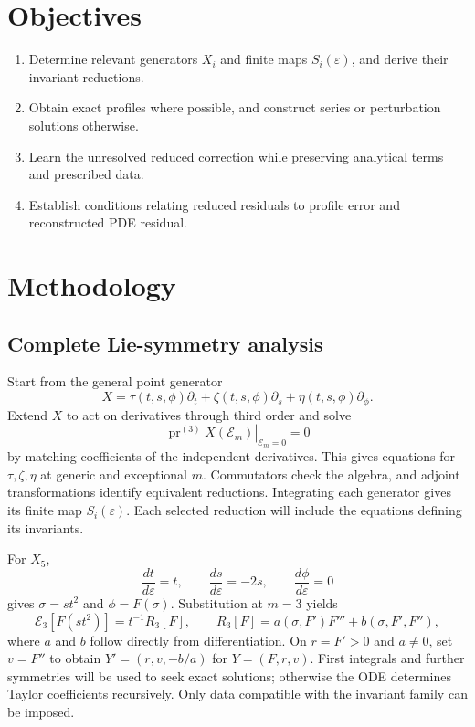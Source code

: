 \documentclass[12pt]{article}
\newcommand{\E}{\mathcal E}
\newcommand{\pr}{\operatorname{pr}}
\newcommand{\eps}{\varepsilon}
\begin{document}
\section{Objectives}

\begin{enumerate}
\item Determine relevant generators $X_i$ and finite maps $S_i(\eps)$, and derive their invariant reductions.
\item Obtain exact profiles where possible, and construct series or perturbation solutions otherwise.
\item Learn the unresolved reduced correction while preserving analytical terms and prescribed data.
\item Establish conditions relating reduced residuals to profile error and reconstructed PDE residual.
\end{enumerate}

\section{Methodology}

\subsection{Complete Lie-symmetry analysis}

Start from the general point generator
\[
X=\tau(t,s,\phi)\partial_t+\zeta(t,s,\phi)\partial_s+
\eta(t,s,\phi)\partial_\phi.
\]
Extend $X$ to act on derivatives through third order \cite{olver} and solve
\[
\left.\pr^{(3)}X(\E_m)\right|_{\E_m=0}=0
\]
by matching coefficients of the independent derivatives. This gives equations for $\tau,\zeta,\eta$ at generic and exceptional $m$. Commutators check the algebra, and adjoint transformations identify equivalent reductions. Integrating each generator gives its finite map $S_i(\eps)$. Each selected reduction will include the equations defining its invariants.

For $X_5$,
\[
\frac{dt}{d\eps}=t,\qquad \frac{ds}{d\eps}=-2s,\qquad
\frac{d\phi}{d\eps}=0
\]
gives $\sigma=st^2$ and $\phi=F(\sigma)$.  Substitution at $m=3$ yields
\[
\E_3[F(st^2)]=t^{-1}R_3[F],\qquad
R_3[F]=a(\sigma,F')F'''+b(\sigma,F',F''),
\]
where $a$ and $b$ follow directly from differentiation.
On $r=F'>0$ and $a\ne0$, set $v=F''$ to obtain $Y'=(r,v,-b/a)$ for $Y=(F,r,v)$. First integrals and further symmetries will be used to seek exact solutions; otherwise the ODE determines Taylor coefficients recursively. Only data compatible with the invariant family can be imposed.
\end{document}
